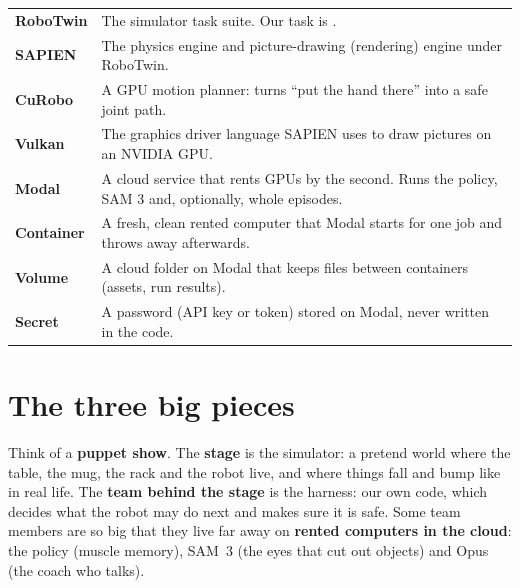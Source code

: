 \documentclass[11pt,a4paper]{article}
\newcommand{\code}[1]{\texttt{\detokenize{#1}}}
\begin{document}
\begin{center}
\begin{tabularx}{\textwidth}{>{\leavevmode\bfseries\color{sky}}p{3.3cm}X}
RoboTwin & The simulator task suite. Our task is \code{hanging_mug}. \\
SAPIEN & The physics engine and picture-drawing (rendering) engine under RoboTwin. \\
CuRobo & A GPU motion planner: turns ``put the hand there'' into a safe joint path. \\
Vulkan & The graphics driver language SAPIEN uses to draw pictures on an NVIDIA GPU. \\
Modal & A cloud service that rents GPUs by the second. Runs the policy, SAM 3 and, optionally, whole episodes. \\
Container & A fresh, clean rented computer that Modal starts for one job and throws away afterwards. \\
Volume & A cloud folder on Modal that keeps files between containers (assets, run results). \\
Secret & A password (API key or token) stored on Modal, never written in the code. \\
\bottomrule
\end{tabularx}
\end{center}

\section{The three big pieces}
\label{sec:pieces}

\begin{eli5}
Think of a \textbf{puppet show}. The \textbf{stage} is the simulator: a pretend world where the
table, the mug, the rack and the robot live, and where things fall and bump like in real life.
The \textbf{team behind the stage} is the harness: our own code, which decides what the robot may
do next and makes sure it is safe. Some team members are so big that they live far away on
\textbf{rented computers in the cloud}: the policy (muscle memory), SAM~3 (the eyes that cut out
objects) and Opus (the coach who talks).
\end{eli5}
\end{document}
